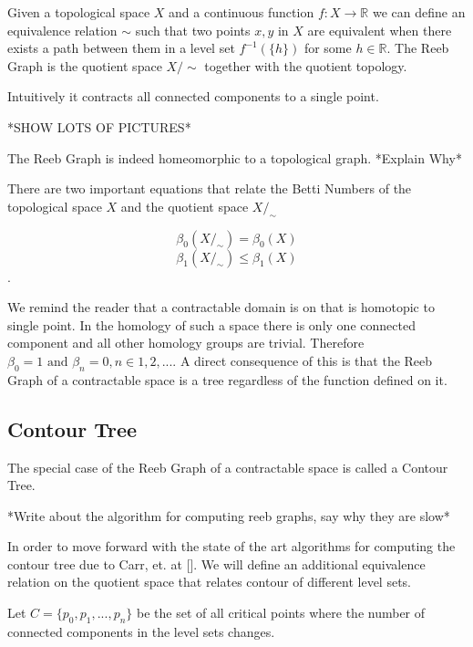 \begin{defn}
Given a topological space $X$ and a continuous function $f: X \to \mathbb{R}$ we can define an equivalence relation $\sim$ such that two points $x, y$ in $X$ are equivalent when there exists a path between them in a level set $f^{-1}(\{h\})$ for some $h \in \mathbb{R}$. The Reeb Graph is the quotient space $X \big/ \sim$ together with the quotient topology.
\end{defn}

Intuitively it contracts all connected components to a single point.

*SHOW LOTS OF PICTURES*


The Reeb Graph is indeed homeomorphic to a topological graph. *Explain Why*

There are two important equations that \cite{comp-topo} relate the Betti Numbers of the topological space $X$ and the quotient space $X \big/ _\sim$

$$ \beta_0(X \big/ _\sim) = \beta_0(X) $$
$$ \beta_1(X \big/ _\sim) \le \beta_1(X) $$.

We remind the reader that a contractable domain is on that is homotopic to single point. In the homology of such a space there is only one connected component and all other homology groups are trivial. Therefore $\beta_0 = 1 \text{ and } \beta_n = 0, n \in {1, 2, ...}$. A direct consequence of this is that the Reeb Graph of a contractable space is a tree regardless of the function defined on it.

\subsection{Contour Tree}

The special case of the Reeb Graph of a contractable space is called a Contour Tree. 

*Write about the algorithm for computing reeb graphs, say why they are slow*

In order to move forward with the state of the art algorithms for computing the contour tree due to Carr, et. at []. We will define an additional equivalence relation on the quotient space that relates contour of different level sets.


\begin{defn}  Let $C = \{p_0, p_1, ..., p_n\}$ be the set of all critical points where the number of connected components in the level sets changes. \end{defn}

